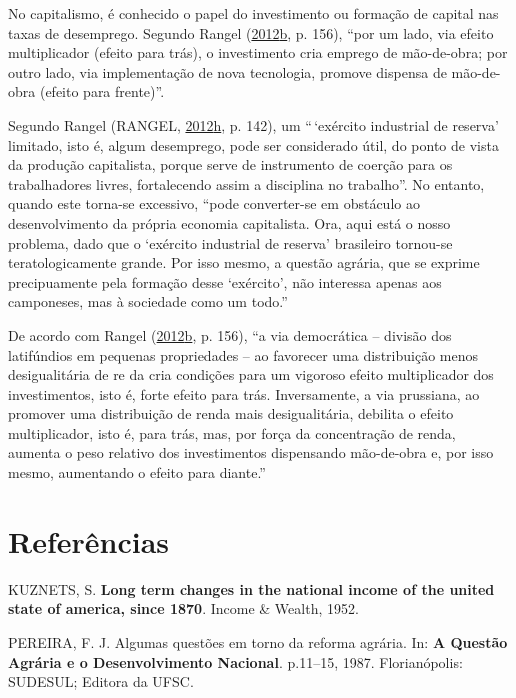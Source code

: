 \documentclass[a4paper, 12pt]{article}
\begin{document}
No capitalismo, é conhecido o papel do investimento ou formação de
capital nas taxas de desemprego. Segundo Rangel
(\protect\hyperlink{ref-rangel1988}{2012}\protect\hyperlink{ref-rangel1988}{b},
p. 156), ``por um lado, via efeito multiplicador (efeito para trás), o
investimento cria emprego de mão-de-obra; por outro lado, via
implementação de nova tecnologia, promove dispensa de mão-de-obra
(efeito para frente)''.

Segundo Rangel (RANGEL,
\protect\hyperlink{ref-rangel1986c}{2012}\protect\hyperlink{ref-rangel1986c}{h},
p. 142), um ``\,`exército industrial de reserva' limitado, isto é, algum
desemprego, pode ser considerado útil, do ponto de vista da produção
capitalista, porque serve de instrumento de coerção para os
trabalhadores livres, fortalecendo assim a disciplina no trabalho''. No
entanto, quando este torna-se excessivo, ``pode converter-se em
obstáculo ao desenvolvimento da própria economia capitalista. Ora, aqui
está o nosso problema, dado que o `exército industrial de reserva'
brasileiro tornou-se teratologicamente grande. Por isso mesmo, a questão
agrária, que se exprime precipuamente pela formação desse `exército',
não interessa apenas aos camponeses, mas à sociedade como um todo.''

De acordo com Rangel
(\protect\hyperlink{ref-rangel1988}{2012}\protect\hyperlink{ref-rangel1988}{b},
p. 156), ``a via democrática -- divisão dos latifúndios em pequenas
propriedades -- ao favorecer uma distribuição menos desigualitária de re
da cria condições para um vigoroso efeito multiplicador dos
investimentos, isto é, forte efeito para trás. Inversamente, a via
prussiana, ao promover uma distribuição de renda mais desigualitária,
debilita o efeito multiplicador, isto é, para trás, mas, por força da
concentração de renda, aumenta o peso relativo dos investimentos
dispensando mão-de-obra e, por isso mesmo, aumentando o efeito para
diante.''

\hypertarget{referencias}{%
\section*{Referências}\label{referencias}}

\hypertarget{refs}{}
\leavevmode\hypertarget{ref-kuznets}{}%
KUZNETS, S. \textbf{Long term changes in the national income of the
united state of america, since 1870}. Income \& Wealth, 1952.

\leavevmode\hypertarget{ref-questaoagraria}{}%
PEREIRA, F. J. Algumas questões em torno da reforma agrária. In:
\textbf{A Questão Agrária e o Desenvolvimento Nacional}. p.11--15, 1987.
Florianópolis: SUDESUL; Editora da UFSC.
\end{document}
